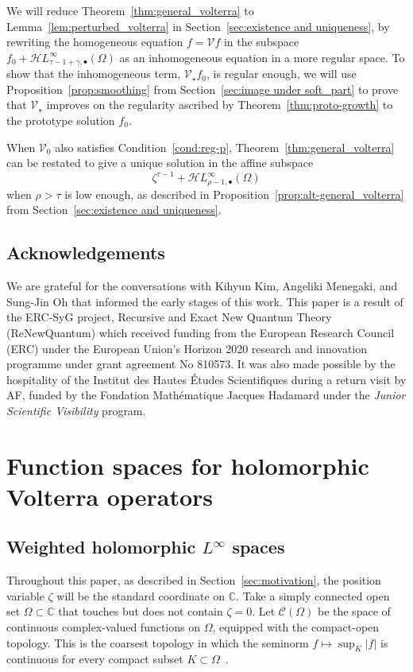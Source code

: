 \documentclass[final]{siamart220329}
\newcommand{\C}{\mathbb{C}}
\newcommand{\cont}{\mathcal{C}}
\newcommand{\singexp}[2]{\mathcal{H}L^\infty_{#1, #2}}
\newcommand{\singexpalg}[1]{\singexp{#1}{\bullet}}
\newcommand{\volterra}{\mathcal{V}}
\newcommand{\hardpart}{\mathcal{V}_0}
\newcommand{\softpart}{\mathcal{V}_\star}
\newcommand{\domain}{\Omega}
\begin{document}
We will reduce Theorem~\ref{thm:general_volterra} to Lemma~\ref{lem:perturbed_volterra} in Section~\ref{sec:existence and uniqueness}, by rewriting the homogeneous equation $f = \volterra f$ in the subspace $f_0 + \singexpalg{\tau-1+\gamma}(\Omega)$ as an inhomogeneous equation in a more regular space. To show that the inhomogeneous term, $\softpart f_0$, is regular enough, we will use Proposition~\ref{prop:smoothing} from Section~\ref{sec:image under soft_part} to prove that $\softpart$ improves on the regularity ascribed by Theorem~\ref{thm:proto-growth} to the prototype solution $f_0$.
\begin{rmk}
When $\hardpart$ also satisfies Condition~\eqref{cond:reg-p}, Theorem~\ref{thm:general_volterra} can be restated to give a unique solution in the affine subspace
\[ \zeta^{\tau-1} + \singexpalg{\rho-1}(\domain) \]
when $\rho > \tau$ is low enough, as described in Proposition~\ref{prop:alt-general_volterra} from Section~\ref{sec:existence and uniqueness}.
\end{rmk}
\subsection{Acknowledgements}
We are grateful for the conversations with Kihyun Kim, Angeliki Menegaki, and Sung-Jin Oh that informed the early stages of this work. This paper is a result of the ERC-SyG project, Recursive and Exact New Quantum Theory (ReNewQuantum) which received funding from the European Research Council (ERC) under the European Union's Horizon 2020 research and innovation programme under grant agreement No 810573. It was also made possible by the hospitality of the Institut des Hautes \'{E}tudes Scientifiques during a return visit by AF, funded by the Fondation Math\'{e}matique Jacques Hadamard under the \textit{Junior Scientific Visibility} program.
\section{Function spaces for holomorphic Volterra operators}\label{fn-spaces}
\subsection{Weighted holomorphic $L^{\infty}$ spaces}\label{sec:fn-space-defs}
Throughout this paper, as described in Section~\ref{sec:motivation}, the position variable $\zeta$ will be the standard coordinate on $\C$. Take a simply connected open set $\domain \subset \C$ that touches but does not contain $\zeta = 0$. Let $\cont(\domain)$ be the space of continuous complex-valued functions on $\domain$, equipped with the compact-open topology. This is the coarsest topology in which the seminorm $f \mapsto \sup_K |f|$ is continuous for every compact subset $K \subset \domain$~\cite[Example~2.6 and Section~4 notes]{fnl-cpx-anal}.
\end{document}
